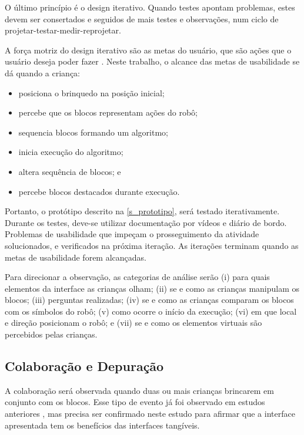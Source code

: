 O último princípio é o design iterativo. Quando testes apontam problemas, estes devem ser consertados e seguidos de mais testes e observações, num ciclo de projetar-testar-medir-reprojetar. 

A força motriz do design iterativo são as metas do usuário, que são ações que o usuário deseja poder fazer \cite{rogers_design_2013}. Neste trabalho, o alcance das metas de usabilidade se dá quando a criança:

\begin{itemize}
    \item posiciona o brinquedo na posição inicial;
    \item percebe que os blocos representam ações do robô;
    \item sequencia blocos formando um algoritmo;
    \item inicia execução do algoritmo;
    \item altera sequência de blocos; e
    \item percebe blocos destacados durante execução.
\end{itemize}

Portanto, o protótipo descrito na \autoref{s_prototipo}, será testado iterativamente. Durante os testes, deve-se utilizar documentação por vídeos e diário de bordo. Problemas de usabilidade que impeçam o prosseguimento da atividade  solucionados, e verificados na próxima iteração. As iterações terminam quando as metas de usabilidade forem alcançadas.

Para direcionar a observação, as categorias de análise serão (i) 
para quais elementos da interface as crianças olham;
(ii) se e como as crianças manipulam os blocos; (iii) perguntas realizadas; (iv) se e como as crianças comparam os blocos com os símbolos do robô; (v) como ocorre o início da execução; (vi) em que local e direção posicionam o robô; e (vii) se e como os elementos virtuais são percebidos pelas crianças.

\subsection{Colaboração e Depuração}

A colaboração será observada quando duas ou mais crianças brincarem em conjunto com os blocos. Esse tipo de evento já foi observado em estudos anteriores \cite{sapounidis_tangible_2019, raabe_estudo_2019}, mas precisa ser confirmado neste estudo para afirmar que a interface apresentada tem os benefícios das interfaces tangíveis. 

